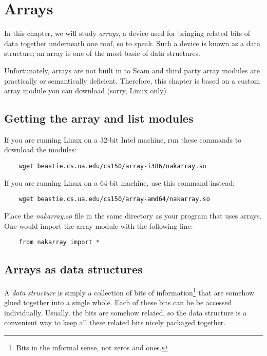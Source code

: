 \chapter{Arrays}
\label{Arrays}

In this chapter, we will study {\it arrays}, a device
used for bringing related bits of data together underneath one
roof, so to speak. Such a device is known as a data structure;
an array is one of the most basic of data structures.

Unfortunately, arrays are not built in to Scam and
third party array modules are practically or semantically 
deficient. Therefore,
this chapter is based on a custom array module you can
download (sorry, Linux only).

\section{Getting the array and list modules}

If you are running Linux on a 32-bit Intel machine,
run these commands to download the modules:

\begin{verbatim}
    wget beastie.cs.ua.edu/cs150/array-i386/nakarray.so
\end{verbatim}

If you are running Linux on a 64-bit machine, use this
command instead:

\begin{verbatim}
    wget beastie.cs.ua.edu/cs150/array-amd64/nakarray.so
\end{verbatim}

Place the {\it nakarray.so} file
in the same directory as
your program that uses arrays. One would
import the array module
with the following line:

\begin{verbatim}
    from nakarray import *
\end{verbatim}

\section{Arrays as data structures}

A {\it data}
{\it structure} is simply a collection of
bits of information\footnote{
Bits in the informal sense, not zeros and ones.
}
that are
somehow glued together into a single whole. Each of these bits
can be be accessed individually. Usually, the bits are somehow
related, so the data structure is a convenient way
to keep all these related bits nicely packaged together.


